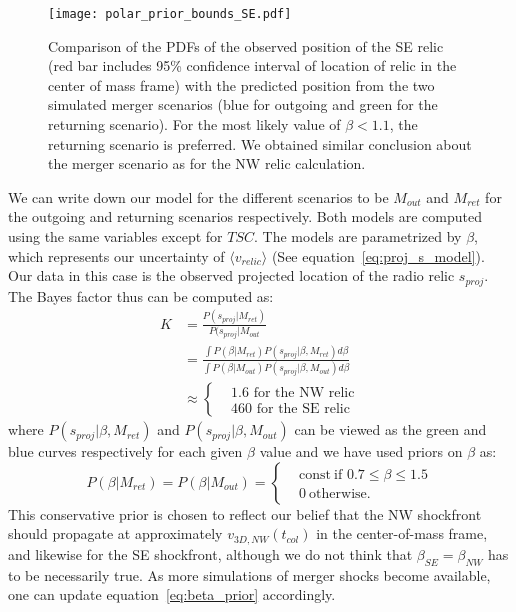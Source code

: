 \begin{figure}
	\texttt{[image: polar\_prior\_bounds\_SE.pdf]}
	\caption{Comparison of the PDFs of the observed position of the SE relic (red bar
		includes 95\% confidence interval of location of relic in the center of
		mass frame) with the	predicted position from the two simulated merger scenarios (blue for
	outgoing and green for the returning scenario). 
	For the most likely value of $\beta < 1.1$, the returning scenario is preferred. 
	We obtained similar conclusion about the merger scenario as for the NW
	relic calculation.
	\label{fig:positionprior_SE}}
\end{figure}
We can write down our model for the different scenarios to be $M_{out}$ and
$M_{ret}$ for the outgoing and returning scenarios respectively. Both
models are computed using the same variables except for $TSC$. The models
are parametrized by $\beta$, which represents our uncertainty of $\langle v_{relic} \rangle$
(See equation~\ref{eq:proj_s_model}). Our data in this
case is the observed projected location of the radio relic $s_{proj}$. 
The Bayes factor thus can be computed as: 
\begin{align}
	K &= \frac{P(s_{proj} | M_{ret})}{P(s_{proj}| M_{out}}\\
	 &= \frac
	 {\int P(\beta | M_{ret}) P(s_{proj} | \beta, M_{ret}) d\beta}
	 {\int P(\beta | M_{out}) P(s_{proj} | \beta, M_{out})
 d\beta}\\
 &\approx 
 \begin{cases}
 & 1.6 \text{ for the NW relic}\\
 & 460 \text{ for the SE relic}
 \end{cases}
\end{align}
where $P(s_{proj} | \beta, M_{ret})$ and $P(s_{proj} | \beta, M_{out})$ can be
viewed as the green and blue curves respectively for each given $\beta$ value and we
have used priors on $\beta$ as: 
\begin{equation}
	\label{eq:beta_prior}
	P(\beta | M_{ret}) = P(\beta | M_{out}) =  
	\begin{cases}
		& \text{const}~\text{if } 0.7 \leq \beta \leq 1.5 \\
		& 0~\text{otherwise}.
	\end{cases}
\end{equation}
This conservative prior is chosen to reflect our belief that the
NW shockfront should propagate at approximately $v_{3D, NW}(t_{col})$ in the
center-of-mass frame, and likewise for the SE shockfront, although we do
not think that $\beta_{SE} = \beta_{NW}$ has to be necessarily true. 
As more
simulations of merger shocks become available, one can update equation~\ref{eq:beta_prior} accordingly.


\bsp 
\label{lastpage} 

